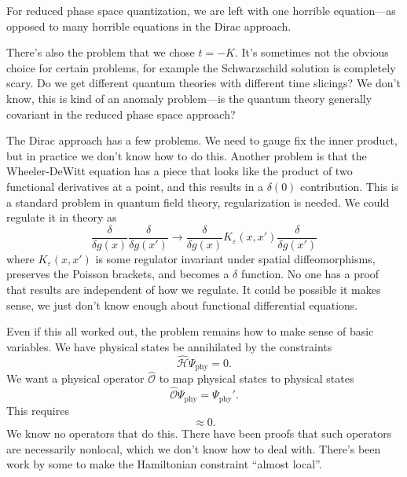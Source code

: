 \lecture

For reduced phase space quantization, we are left with one horrible
equation---as opposed to many horrible equations in the Dirac approach.

There's also the problem that we chose $t=-K$. It's sometimes not the
obvious choice for certain problems, for example the Schwarzschild
solution is completely scary. Do we get different quantum theories with
different time slicings? We don't know, this is kind of an anomaly
problem---is the quantum theory generally covariant in the reduced phase
space approach?

The Dirac approach has a few problems. We need to gauge fix the inner
product, but in practice we don't know how to do this. Another problem
is that the Wheeler-DeWitt equation has a piece that looks like the
product of two functional derivatives at a point, and this results in a
$\delta(0)$ contribution. This is a standard problem in quantum field
theory, regularization is needed. We could regulate it in theory as
\begin{equation}
\frac{\delta}{\delta g(x)}\frac{\delta}{\delta g(x')}\to
\frac{\delta}{\delta g(x)}K_{\varepsilon}(x,x')\frac{\delta}{\delta g(x')}
\end{equation}
where $K_{\varepsilon}(x,x')$ is some regulator invariant under spatial
diffeomorphisms, preserves the Poisson brackets, and becomes a $\delta$
function. No one has a proof that results are independent of how we
regulate. It could be possible it makes sense, we just don't know enough
about functional differential equations.

Even if this all worked out, the problem remains how to make sense of
basic variables. We have physical states be annihilated by the
constraints
\begin{equation}
\widehat{\mathcal{H}}\Psi_{\text{phy}}=0.
\end{equation}
We want a physical operator $\widehat{\mathcal{O}}$ to map physical
states to physical states
\begin{equation}
\widehat{\mathcal{O}}\Psi_{\text{phy}}=\Psi_{\text{phy}}'.
\end{equation}
This requires
\begin{equation}
[\widehat{\mathcal{H}},\widehat{\mathcal{O}}]\approx 0.
\end{equation}
We know no operators that do this. There have been proofs that such
operators are necessarily nonlocal, which we don't know how to deal
with. There's been work by some to make the Hamiltonian constraint
``almost local''.

